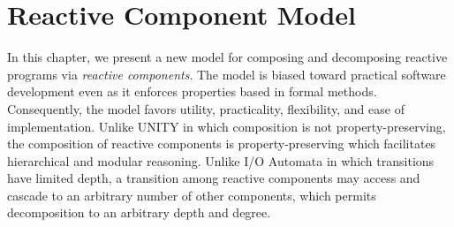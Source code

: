 \chapter{Reactive Component Model}
\label{model}

In this chapter, we present a new model for composing and decomposing reactive programs via \emph{reactive components}.
The model is biased toward practical software development even as it enforces properties based in formal methods.
Consequently, the model favors utility, practicality, flexibility, and ease of implementation.
Unlike UNITY in which composition is not property-preserving, the composition of reactive components is property-preserving which facilitates hierarchical and modular reasoning.
Unlike I/O Automata in which transitions have limited depth, a transition among reactive components may access and cascade to an arbitrary number of other components, which permits decomposition to an arbitrary depth and degree.



